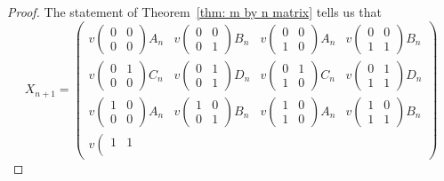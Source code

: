 \documentclass[12pt]{article}
\theoremstyle{plain}
\theoremstyle{remark}
\theoremstyle{definition}
\theoremstyle{remark}
\theoremstyle{definition}
\begin{document}
\begin{proof}
The statement of Theorem~\ref{thm: m by n matrix} tells us that
\[
X_{n+1}=\begin{pmatrix}v\left(\begin{smallmatrix}0 & 0\\
0 & 0
\end{smallmatrix}\right)A_{n} & v\left(\begin{smallmatrix}0 & 0\\
0 & 1
\end{smallmatrix}\right)B_{n} & v\left(\begin{smallmatrix}0 & 0\\
1 & 0
\end{smallmatrix}\right)A_{n} & v\left(\begin{smallmatrix}0 & 0\\
1 & 1
\end{smallmatrix}\right)B_{n}\\
v\left(\begin{smallmatrix}0 & 1\\
0 & 0
\end{smallmatrix}\right)C_{n} & v\left(\begin{smallmatrix}0 & 1\\
0 & 1
\end{smallmatrix}\right)D_{n} & v\left(\begin{smallmatrix}0 & 1\\
1 & 0
\end{smallmatrix}\right)C_{n} & v\left(\begin{smallmatrix}0 & 1\\
1 & 1
\end{smallmatrix}\right)D_{n}\\
v\left(\begin{smallmatrix}1 & 0\\
0 & 0
\end{smallmatrix}\right)A_{n} & v\left(\begin{smallmatrix}1 & 0\\
0 & 1
\end{smallmatrix}\right)B_{n} & v\left(\begin{smallmatrix}1 & 0\\
1 & 0
\end{smallmatrix}\right)A_{n} & v\left(\begin{smallmatrix}1 & 0\\
1 & 1
\end{smallmatrix}\right)B_{n}\\
v\left(\begin{smallmatrix}1 & 1\\

\end{smallmatrix}
\end{pmatrix}\]
\end{proof}
\end{document}
